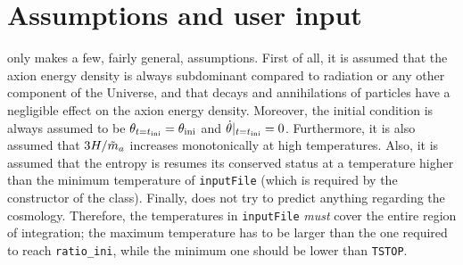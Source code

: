 \documentclass[11pt,a4paper]{article}
\begin{document}
\section{Assumptions and user input}\label{sec:assumptions}
\setcounter{equation}{0}
%
\mimes only makes a few, fairly general, assumptions. First of all, it is assumed that the axion energy density is always subdominant compared to radiation or any other component of the Universe, and that decays and annihilations of particles have a negligible effect on the axion energy density. Moreover, the initial condition is always assumed to be $\theta_{t=t_{\rm ini}{}} = \theta_{\rm ini}{}$ and $\dot \theta|_{t=t_{\rm ini}{}}=0$. 
%
Furthermore, it is also assumed that $3H/\tilde m_{a}{}$ increases monotonically at high temperatures. 
%
Also, it is assumed that the entropy is resumes its conserved status at a temperature higher than the minimum temperature of  {\tt inputFile} (which is required by the constructor of the  class).  
%
Finally, \mimes does not try to predict anything regarding the cosmology. Therefore, the temperatures in {\tt inputFile} {\em must} cover the entire region of  integration; \ie the maximum temperature has to be larger than the one required to reach {\tt ratio\_ini}, while the minimum one should be lower than {\tt TSTOP}.
\end{document}
